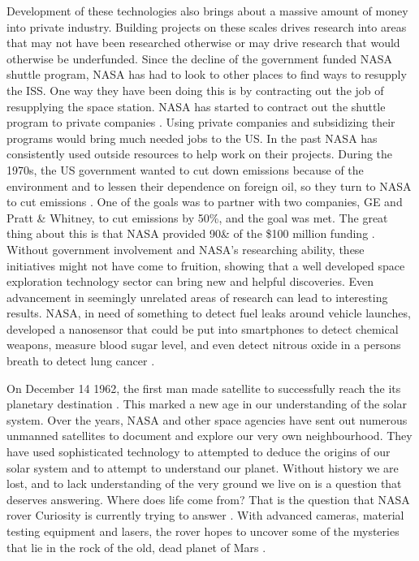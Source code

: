 \documentclass[a4paper,12pt]{article}
\begin{document}
Development of these technologies also brings about a massive amount of money into private industry. Building projects on these scales drives research into areas that may not have been researched otherwise or may drive research that would otherwise be underfunded. Since the decline of the government funded NASA shuttle program, NASA has had to look to other places to find ways to resupply the ISS. One way they have been doing this is by contracting out the job of resupplying the space station. NASA has started to contract out the shuttle program to private companies \autocite{woodsbrian}. Using private companies and subsidizing their programs would bring much needed jobs to the US. In the past NASA has consistently used outside resources to help work on their projects. During the 1970s, the US government wanted to cut down emissions because of the environment and to lessen their dependence on foreign oil, so they turn to NASA to cut emissions \autocite{reddy2013}. One of the goals was to partner with two companies, GE and Pratt \& Whitney, to cut emissions by 50\%, and the goal was met. The great thing about this is that NASA provided 90\& of the \$100 million funding \autocite{reddy2013}. Without government involvement and NASA's researching ability, these initiatives might not have come to fruition, showing that a well developed space exploration technology sector can bring new and helpful discoveries. Even advancement in seemingly unrelated areas of research can lead to interesting results. NASA, in need of something to detect fuel leaks around vehicle launches, developed a nanosensor that could be put into smartphones to detect chemical weapons, measure blood sugar level, and even detect nitrous oxide in a persons breath to detect lung cancer \autocite{times2002}.   

On December 14 1962, the first man made satellite to successfully reach the its planetary destination \autocite{david2012}. This marked a new age in our understanding of the solar system. Over the years, NASA and other space agencies have sent out numerous unmanned satellites to document and explore our very own neighbourhood. They have used sophisticated technology to attempted to deduce the origins of our solar system and to attempt to understand our planet. Without history we are lost, and to lack understanding of the very ground we live on is a question that deserves answering. Where does life come from? That is the question that NASA rover Curiosity is currently trying to answer \autocite{gross2012}. With advanced cameras, material testing equipment and lasers, the rover hopes to uncover some of the mysteries that lie in the rock of the old, dead planet of Mars \autocite{gross2012}.
\end{document}
